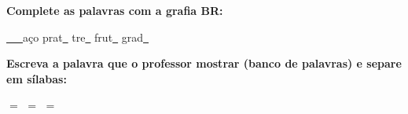 \noindent\textbf{Complete as palavras com a grafia BR:}
\begin{center}
  \underline{~~~}aço \quad prat\underline{~} \quad tre\underline{~} \quad frut\underline{~} \quad grad\underline{~}
\end{center}

\noindent\textbf{Escreva a palavra que o professor mostrar (banco de palavras) e separe em sílabas:}

\begin{center}
  \underline{\hspace{2cm}} $=$ \underline{\hspace{2cm}} \quad \underline{\hspace{2cm}} $=$ \underline{\hspace{2cm}} \quad \underline{\hspace{2cm}} $=$ \underline{\hspace{2cm}}
  \end{center}



